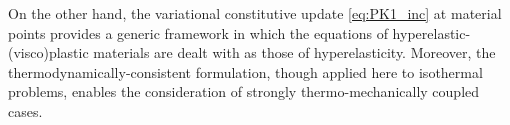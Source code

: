 On the other hand, the variational constitutive update \eqref{eq:PK1_inc} at material points provides a generic framework in which the equations of hyperelastic-(visco)plastic materials are dealt with as those of hyperelasticity.
Moreover, the thermodynamically-consistent formulation, though applied here to isothermal problems, enables the consideration of strongly thermo-mechanically coupled cases.




